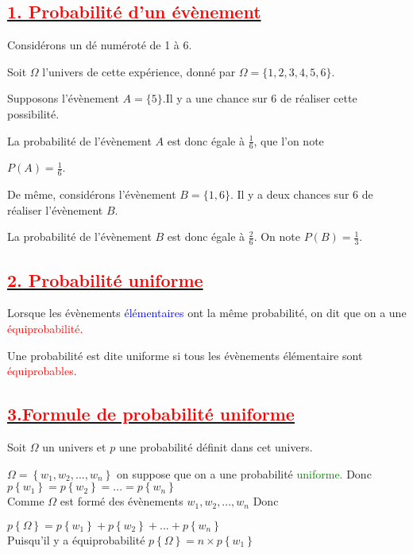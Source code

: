 \documentclass[12pt]{article}
\begin{document}
\subsection*{\underline{\textbf{\textcolor{red}{1. Probabilité d'un évènement}}}}

Considérons un dé numéroté de 1 à 6.

Soit $\Omega$ l'univers de cette expérience, donné par $\Omega=\{1, 2, 3, 4, 5, 6\}$.

Supposons l'évènement $A=\{5\}$.Il y a une chance sur 6 de réaliser cette possibilité.

La probabilité de l'évènement $A$ est donc égale à $\frac{1}{6}$, que l'on note

 $P(A)=\frac{1}{6}$.

De même, considérons l'évènement $B=\{1, 6\}$. Il y a deux chances sur 6 de réaliser l'évènement $B$.

La probabilité de l'évènement $B$ est donc égale à $\frac{2}{6}$. On note $P(B)=\frac{1}{3}$.
\subsection*{\underline{\textbf{\textcolor{red}{2. Probabilité uniforme}}}}
Lorsque les évènements \textcolor{blue}{élémentaires} ont la même probabilité, on dit que on a une 
\textcolor{red}{équiprobabilité.}

Une probabilité est dite uniforme si tous les évènements élémentaire sont \textcolor{red}{équiprobables}.\\
\subsection*{\underline{\textbf{\textcolor{red}{3.Formule de probabilité uniforme}}}}
Soit $\Omega$ un univers et $p$ une probabilité définit dans cet univers.

$\Omega=\left\lbrace w_{1}, w_{2},...,w_{n}\right\rbrace $ on suppose que on a une probabilité \textcolor{green}{uniforme.}
Donc $p\left\lbrace w_{1} \right\rbrace =p\left\lbrace w_{2} \right\rbrace =...
=p\left\lbrace w_{n} \right\rbrace$\\
Comme $\Omega$ est formé des évènements $w_{1}, w_{2},...,w_{n}$ Donc


$p\left\lbrace \Omega\right\rbrace =p\left\lbrace w_{1} \right\rbrace +p\left\lbrace w_{2} \right\rbrace +...+p\left\lbrace w_{n} \right\rbrace$\\
Puisqu'il y a équiprobabilité 
$p\left\lbrace \Omega\right\rbrace =n\times p\left\lbrace w_{1} \right\rbrace$
\end{document}
